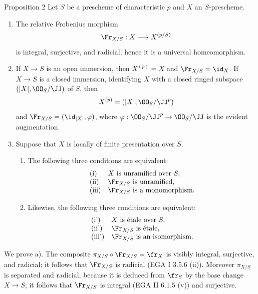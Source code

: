 \begin{statement}{Proposition 2}
Let $S$ be a prescheme of characteristic $p$ and $X$ an $S$-prescheme.
\begin{enumerate}[label=\alph*)]
\item The relative Frobenius morphism
\[
\Fr_{X/S}:X\longrightarrow X^{(p/S)}
\]
is integral, surjective, and radicial; hence it is a universal homeomorphism.

\item If $X\to S$ is an open immersion, then $X^{(p)}=X$ and $\Fr_{X/S}=\id_X$. If $X\to S$ is a closed immersion, identifying $X$ with a closed ringed subspace $(|X|,\OO_S/\JJ)$ of $S$, then
\[
X^{(p)}=(|X|,\OO_S/\JJ^p)
\]
and $\Fr_{X/S}=(\id_{|X|},\varphi)$, where $\varphi:\OO_S/\JJ^p\to\OO_S/\JJ$ is the evident augmentation.

\item Suppose that $X$ is locally of finite presentation over $S$.
\begin{enumerate}[label=\arabic*)]
\item The following three conditions are equivalent:
\[
\begin{array}{ll}
\text{(i)}& X\text{ is unramified over }S,\\
\text{(ii)}& \Fr_{X/S}\text{ is unramified},\\
\text{(iii)}& \Fr_{X/S}\text{ is a monomorphism}.
\end{array}
\]
\item Likewise, the following three conditions are equivalent:
\[
\begin{array}{ll}
\text{(i')}& X\text{ is étale over }S,\\
\text{(ii')}& \Fr_{X/S}\text{ is étale},\\
\text{(iii')}& \Fr_{X/S}\text{ is an isomorphism}.
\end{array}
\]
\end{enumerate}
\end{enumerate}
\end{statement}

We prove a). The composite $\pi_{X/S}\circ\Fr_{X/S}=\fr_X$ is visibly integral, surjective, and radicial; it follows that $\Fr_{X/S}$ is radicial (EGA I 3.5.6 (ii)). Moreover $\pi_{X/S}$ is separated and radicial, because it is deduced from $\fr_S$ by the base change $X\to S$; it follows that $\Fr_{X/S}$ is integral (EGA II 6.1.5 (v)) and surjective.

